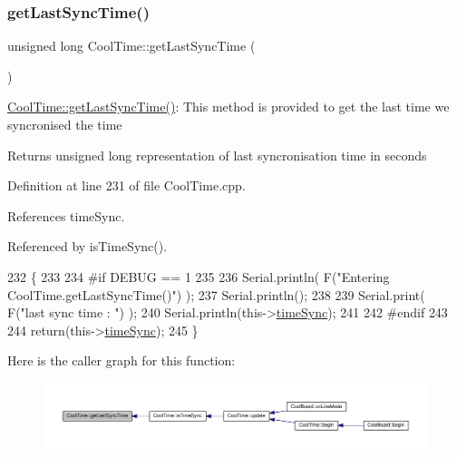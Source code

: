 \subsubsection{\texorpdfstring{get\+Last\+Sync\+Time()}{getLastSyncTime()}}
{\footnotesize\ttfamily unsigned long Cool\+Time\+::get\+Last\+Sync\+Time (\begin{DoxyParamCaption}{ }\end{DoxyParamCaption})}

\hyperlink{classCoolTime_a5d17f707a9d337720493b2bce9d41c21}{Cool\+Time\+::get\+Last\+Sync\+Time()}\+: This method is provided to get the last time we syncronised the time

\begin{DoxyReturn}{Returns}
unsigned long representation of last syncronisation time in seconds 
\end{DoxyReturn}


Definition at line 231 of file Cool\+Time.\+cpp.



References time\+Sync.



Referenced by is\+Time\+Sync().


\begin{DoxyCode}
232 \{
233 
234 \textcolor{preprocessor}{#if DEBUG == 1 }
235 
236     Serial.println( F(\textcolor{stringliteral}{"Entering CoolTime.getLastSyncTime()"}) );
237     Serial.println();
238     
239     Serial.print( F(\textcolor{stringliteral}{"last sync time : "}) );
240     Serial.println(this->\hyperlink{classCoolTime_a9d032e76c3470a15b3bbbc52af6463f7}{timeSync});
241 
242 \textcolor{preprocessor}{#endif }
243 
244     \textcolor{keywordflow}{return}(this->\hyperlink{classCoolTime_a9d032e76c3470a15b3bbbc52af6463f7}{timeSync});
245 \}
\end{DoxyCode}
Here is the caller graph for this function\+:
\nopagebreak
\begin{figure}[H]
\begin{center}
\leavevmode
\includegraphics[width=350pt]{classCoolTime_a5d17f707a9d337720493b2bce9d41c21_icgraph}
\end{center}
\end{figure}
\mbox{\label{classCoolTime_a41fbbbfd651c2079f54d4b2911e4c705}} 
